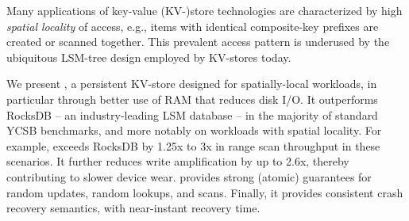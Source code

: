 Many applications of key-value (KV-)store technologies are characterized by high \emph{spatial locality}
of access, e.g., items with identical composite-key prefixes are created or scanned together.  
This prevalent access pattern is underused by the ubiquitous LSM-tree design employed by KV-stores today.

We present \sys, a persistent KV-store designed for spatially-local workloads, in particular through better use of RAM
that reduces disk I/O.  It outperforms RocksDB -- an industry-leading LSM database -- in the majority 
of standard YCSB benchmarks, and more notably on workloads with spatial locality. For example, \sys\/ 
exceeds RocksDB by 1.25x to 3x in range scan throughput in these scenarios. It further reduces write amplification 
by up to 2.6x, thereby contributing to slower device wear. \sys\/ provides strong (atomic) guarantees for random updates, random lookups, and scans. Finally, it provides consistent crash recovery semantics, with near-instant recovery time. 